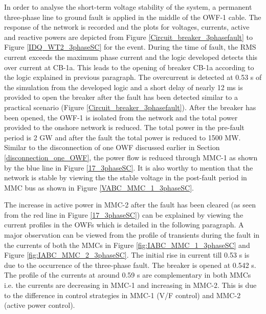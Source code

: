 In order to analyse the short-term voltage stability of the system, a permanent three-phase line to ground fault is applied in the middle of the \gls{OWF}-1 cable. The response of the network is recorded and the plots for voltages, currents, active and reactive powers are depicted from Figure \ref{Circuit_breaker_3phasefault} to Figure \ref{IDQ_WT2_3phaseSC} for the event. During the time of fault, the RMS current exceeds the maximum phase current and the logic developed detects this over current at CB-1a. This leads to the opening of breaker CB-1a according to the logic explained in previous paragraph. The overcurrent is detected at 0.53 s of the simulation from the developed logic and a short delay of nearly 12 ms is provided to open the breaker after the fault has been detected similar to a practical scenario (Figure \ref{Circuit_breaker_3phasefault}). After the breaker has been opened, the \gls{OWF}-1 is isolated from the network and the total power provided to the onshore network is reduced. The total power in the pre-fault period is 2 GW and after the fault the total power is reduced to 1500 MW. Similar to the disconnection of one \gls{OWF} discussed earlier in Section \ref{disconnection_one_OWF}, the power flow is reduced through \gls{MMC}-1 as shown by the blue line in Figure \ref{17_3phaseSC}. It is also worthy to mention that the network is stable by viewing the the stable voltage in the post-fault period in \gls{MMC} bus as shown in Figure \ref{VABC_MMC_1_3phaseSC}.



The increase in active power in \gls{MMC}-2 after the fault has been cleared (as seen from the red line in Figure \ref{17_3phaseSC}) can be explained by viewing the current profiles in the \gls{OWF}s which is detailed in the following paragraph. A major observation can be viewed from the profile of transients during the fault in the currents of both the \gls{MMC}s in Figure \ref{fig:IABC_MMC_1_3phaseSC} and Figure \ref{fig:IABC_MMC_2_3phaseSC}. The initial rise in current till 0.53 s is due to the occurrence of the three-phase fault. The breaker is opened at 0.542 s. The profile of the currents at around 0.59 s are complementary in both \gls{MMC}s i.e. the currents are decreasing in \gls{MMC}-1 and increasing in \gls{MMC}-2. This is due to the difference in control strategies in \gls{MMC}-1 (V/F control) and \gls{MMC}-2 (active power control).

